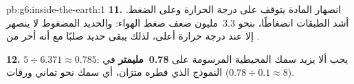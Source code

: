 \begin{solution}{pb:g6:inside-the-earth:1}
\textbf{11.} انصهار المادة يتوقف على درجة الحرارة وعلى
الضغط.  أشد الطبقات انضغاطًا، بنحو
3.3~مليون ضعف ضغط الهواء: والحديد المضغوط لا ينصهر إلا عند
درجة حرارة أعلى، لذلك يبقى حديد  صلبًا مع أنه
أحر من .

\textbf{12.} $5 \div 6.371 \approx 0.785$: يجب ألا يزيد سمك  المحيطية المرسومة
على \textbf{0.78~مليمتر} في النموذج الذي قطره مترَان، أي سمك
نحو ثماني ورقات ($0.78 \div 0.1 \approx 8$).
\end{solution}
